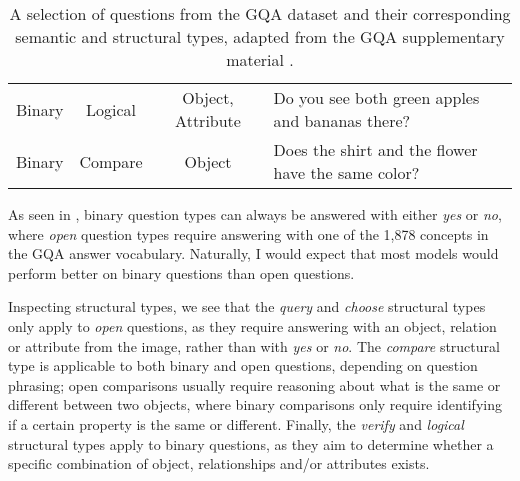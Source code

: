 \begin{table}[htbp]
\begin{footnotesize}
\begin{tabularx}{\linewidth}{cccL}
        Binary & Logical & Object, Attribute & Do you see both green apples and bananas there?\\
        Binary & Compare & Object & Does the shirt and the flower have the same color?\\
        \bottomrule
    \end{tabularx}
    \caption[A selection of questions from the GQA dataset.]{A selection of questions from the GQA dataset and their corresponding semantic and structural types, adapted from the GQA supplementary material \cite{hudson2019gqa_preprint}.}
    \label{table:gqa_question_samples}
    \end{footnotesize}
\end{table}

As seen in \tableautorefname{ \ref{table:gqa_question_samples}}, binary question types can always be answered with either \textit{yes} or \textit{no}, where \textit{open} question types require answering with one of the 1,878 concepts in the GQA answer vocabulary. Naturally, I would expect that most models would perform better on binary questions than open questions.

Inspecting structural types, we see that the \textit{query} and \textit{choose} structural types only apply to \textit{open} questions, as they require answering with an object, relation or attribute from the image, rather than with \textit{yes} or \textit{no}. The \textit{compare} structural type is applicable to both binary and open questions, depending on question phrasing; open comparisons usually require reasoning about what is the same or different between two objects, where binary comparisons only require identifying if a certain property is the same or different. Finally, the \textit{verify} and \textit{logical} structural types apply to binary questions, as they aim to determine whether a specific combination of object, relationships and/or attributes exists.

